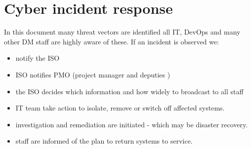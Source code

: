 \section{Cyber incident response}
In this document many threat vectors are identified all IT, DevOps and many other DM staff are highly aware of these.
If an incident is observed we:
\begin{itemize}
\item notify the \gls{ISO} 
\item \gls{ISO} notifies \gls{PMO} (project manager and deputies )
\item the \gls{ISO} decides which information and  how widely to broadcast to all staff
\item IT team take action to isolate, remove or  switch off affected systems.
\item investigation and remediation are initiated - which may be disaster recovery.
\item staff are informed of the plan to return systems to service.
\end{itemize}

